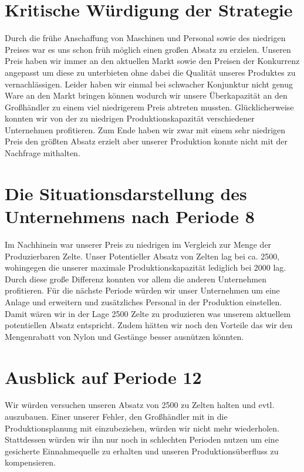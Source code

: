 \documentclass[a4paper, 12pt]{report}
\begin{document}
\begin{flushleft}
\chapter{Kritische Würdigung der Strategie}
Durch die frühe Anschaffung von Maschinen und Personal sowie des niedrigen Preises war es uns schon früh möglich einen großen Absatz zu erzielen.
Unseren Preis haben wir immer an den aktuellen Markt sowie den Preisen der Konkurrenz angepasst um diese zu unterbieten ohne dabei die Qualität unseres Produktes zu vernachlässigen.
Leider haben wir einmal bei schwacher Konjunktur nicht genug Ware an den Markt bringen können wodurch wir unsere Überkapazität an den Großhändler zu einem viel niedrigerem Preis abtreten mussten.
Glücklicherweise konnten wir von der zu niedrigen Produktionskapazität verschiedener Unternehmen profitieren.
Zum Ende haben wir zwar mit einem sehr niedrigen Preis den größten Absatz erzielt aber unserer Produktion konnte nicht mit der Nachfrage mithalten.

\chapter{Die Situationsdarstellung des Unternehmens nach Periode 8}  
Im Nachhinein war unserer Preis zu niedrigen im Vergleich zur Menge der Produzierbaren Zelte.
Unser Potentieller Absatz von Zelten lag bei ca. 2500, wohingegen die unserer maximale Produktionskapazität lediglich bei 2000 lag.
Durch diese große Differenz konnten vor allem die anderen Unternehmen profitieren.
Für die nächste Periode würden wir unser Unternehmen um eine Anlage und erweitern und zusätzliches Personal in der Produktion einstellen.
Damit wären wir in der Lage 2500 Zelte zu produzieren was unserem aktuellem potentiellen Absatz entspricht.
Zudem hätten wir noch den Vorteile das wir den Mengenrabatt von Nylon und Gestänge besser ausnützen könnten.

\chapter{Ausblick auf Periode 12}
Wir würden versuchen unseren Absatz von 2500 zu Zelten halten und evtl. auszubauen.
Einer unserer Fehler, den Großhändler mit in die Produktionsplanung mit einzubeziehen, würden wir nicht mehr wiederholen.
Stattdessen würden wir ihn nur noch in schlechten Perioden nutzen um eine gesicherte Einnahmequelle zu erhalten und unseren Produktionsüberfluss zu kompensieren.



\end{flushleft}
\end{document}
